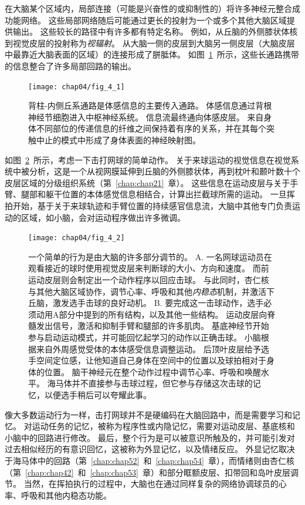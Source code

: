 在大脑某个区域内，局部连接（可能是兴奋性的或抑制性的）将许多神经元整合成功能网络。
这些局部网络随后可能通过更长的投射为一个或多个其他大脑区域提供输出。
这些较长的路径中有许多都有特定名称。
例如，从丘脑的外侧膝状体核到视觉皮层的投射称为\textit{视辐射}。
从大脑一侧的皮层到大脑另一侧皮层（大脑皮层中最靠近大脑表面的区域）的连接形成了胼胝体。
如图~\ref{fig:4_1}~所示，这些长通路携带的信息整合了许多局部回路的输出。


\begin{figure}[htbp]
	\centering
	\texttt{[image: chap04/fig\_4\_1]}
	\caption{背柱-内侧丘系通路是体感信息的主要传入通路。 
		体感信息通过背根神经节细胞进入中枢神经系统。 
		信息流最终通向体感皮层。 
		来自身体不同部位的传递信息的纤维之间保持着有序的关系，并在其每个突触中止的模式中形成了身体表面的神经映射图。}
	\label{fig:4_1}
\end{figure}


如图~\ref{fig:4_2}~所示，考虑一下击打网球的简单动作。
关于来球运动的视觉信息在视觉系统中被分析，这是一个从视网膜延伸到丘脑的外侧膝状体，再到枕叶和颞叶数十个皮层区域的分级组织系统（第~\ref{chap:chap21}~章）。
这些信息在运动皮层与关于手臂、腿部和躯干位置的本体感觉信息相结合，计算出拦截球所需的运动。 
一旦挥拍开始，基于关于来球轨迹和手臂位置的持续感官信息流，大脑中其他专门负责运动的区域，如小脑，会对运动程序做出许多微调。


\begin{figure}[htbp]
	\centering
	\texttt{[image: chap04/fig\_4\_2]}
	\caption{一个简单的行为是由大脑的许多部分调节的。 
		A. 一名网球运动员在观看接近的球时使用视觉皮层来判断球的大小、方向和速度。 
		而前运动皮层则会制定出一个动作程序以回应击球。
		与此同时，杏仁核与其他大脑区域协作，调节心率、呼吸和其他\textit{内稳态}机制，并激活下丘脑，激发选手击球的良好动机。 
		B. 要完成这一击球动作，选手必须动用A部分中提到的所有结构，以及其他一些结构。
		运动皮层向脊髓发出信号，激活和抑制手臂和腿部的许多肌肉。
		基底神经节开始参与启动运动模式，并可能回忆起学习的动作以正确击球。
		小脑根据来自外周感觉受体的本体感受信息调整运动。
		后顶叶皮层给予选手空间定位感，让他知道自己身体在空间中的位置以及球拍相对于身体的位置。
		脑干神经元在整个动作过程中调节心率、呼吸和唤醒水平。
		海马体并不直接参与击球过程，但它参与存储这次击球的记忆，以便选手稍后可以夸耀此事。}
	\label{fig:4_2}
\end{figure}


像大多数运动行为一样，击打网球并不是硬编码在大脑回路中，而是需要学习和记忆。
对运动任务的记忆，被称为程序性或内隐记忆，需要对运动皮层、基底核和小脑中的回路进行修改。
最后，整个行为是可以被意识所触及的，并可能引发对过去相似经历的有意识回忆，这被称为外显记忆，以及情绪反应。 
外显记忆取决于海马体中的回路（第~\ref{chap:chap52}~和~\ref{chap:chap54}~章），而情绪则由杏仁核（第~\ref{chap:chap42}~和~\ref{chap:chap53}~章）和部分眶额皮层、扣带回和岛叶皮层调节。
当然，在挥拍执行的过程中，大脑也在通过同样复杂的网络协调球员的心率、呼吸和其他内稳态功能。



